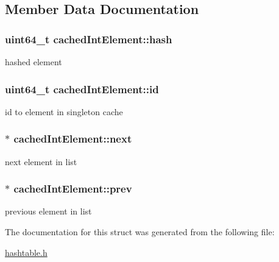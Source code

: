 \subsection{Member Data Documentation}
\subsubsection[{\texorpdfstring{hash}{hash}}]{\setlength{\rightskip}{0pt plus 5cm}uint64\+\_\+t cached\+Int\+Element\+::hash}\hypertarget{structcachedIntElement_a20d62592d37c7e8c91449f534431aeb9}{}\label{structcachedIntElement_a20d62592d37c7e8c91449f534431aeb9}
hashed element 
\subsubsection[{\texorpdfstring{id}{id}}]{\setlength{\rightskip}{0pt plus 5cm}uint64\+\_\+t cached\+Int\+Element\+::id}\hypertarget{structcachedIntElement_acda821458cfe34dda3bff8b7b0373fb9}{}\label{structcachedIntElement_acda821458cfe34dda3bff8b7b0373fb9}
id to element in singleton cache 
\subsubsection[{\texorpdfstring{next}{next}}]{$\ast$ cached\+Int\+Element\+::next}\hypertarget{structcachedIntElement_ae64f5fae8aa27243af30ef13cb3ebce6}{}\label{structcachedIntElement_ae64f5fae8aa27243af30ef13cb3ebce6}
next element in list 
\subsubsection[{\texorpdfstring{prev}{prev}}]{$\ast$ cached\+Int\+Element\+::prev}\hypertarget{structcachedIntElement_a90b30c8883b80e42fbf59fbc1bc8727a}{}\label{structcachedIntElement_a90b30c8883b80e42fbf59fbc1bc8727a}
previous element in list 

The documentation for this struct was generated from the following file\+:\begin{DoxyCompactItemize}
\item 
\hyperlink{hashtable_8h}{hashtable.\+h}\end{DoxyCompactItemize}
